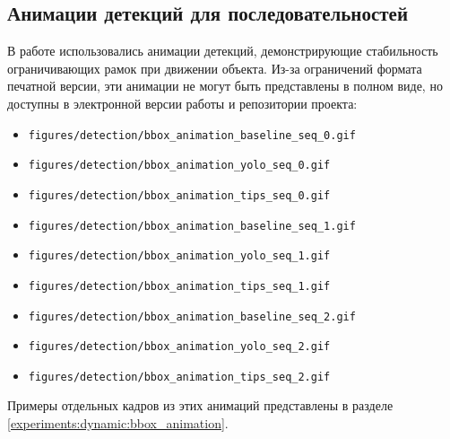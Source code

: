 \subsection{Анимации детекций для последовательностей}
\label{appendix:additional_visualizations:animations}

В работе использовались анимации детекций, демонстрирующие стабильность ограничивающих рамок при движении объекта. Из-за ограничений формата печатной версии, эти анимации не могут быть представлены в полном виде, но доступны в электронной версии работы и репозитории проекта:

\begin{itemize}
    \item \texttt{figures/detection/bbox\_animation\_baseline\_seq\_0.gif}
    \item \texttt{figures/detection/bbox\_animation\_yolo\_seq\_0.gif}
    \item \texttt{figures/detection/bbox\_animation\_tips\_seq\_0.gif}
    \item \texttt{figures/detection/bbox\_animation\_baseline\_seq\_1.gif}
    \item \texttt{figures/detection/bbox\_animation\_yolo\_seq\_1.gif}
    \item \texttt{figures/detection/bbox\_animation\_tips\_seq\_1.gif}
    \item \texttt{figures/detection/bbox\_animation\_baseline\_seq\_2.gif}
    \item \texttt{figures/detection/bbox\_animation\_yolo\_seq\_2.gif}
    \item \texttt{figures/detection/bbox\_animation\_tips\_seq\_2.gif}
\end{itemize}

Примеры отдельных кадров из этих анимаций представлены в разделе \ref{experiments:dynamic:bbox_animation}. 